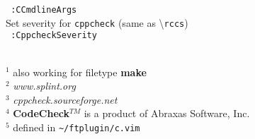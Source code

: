 \documentclass[oneside,11pt,landscape,DIV16]{scrartcl}
\begin{document}
\begin{multicols}{3}
\begin{center}
\begin{flushleft}
\texttt{ :CCmdlineArgs}\\[1.0ex]
%
Set severity for \texttt{cppcheck} (same as \textbackslash\texttt{rccs})\\[1.0ex]
\texttt{ :CppcheckSeverity}\\[1.0ex]
%
\vfill
\begin{minipage}[b]{65mm}%
%
\scriptsize{%
\hrulefill\\
$^1$ also working for filetype \textbf{make}\\
$^2$ \textit{www.splint.org}\\
$^3$ \textit{cppcheck.sourceforge.net}\\
$^4$ \textbf{CodeCheck}$^{TM}$ is a product of Abraxas Software, Inc.\\
$^5$ defined in \verb'~/ftplugin/c.vim'
}%
%
\end{minipage}
%
\end{flushleft}
%
\end{center}
\end{multicols}
\end{document}
